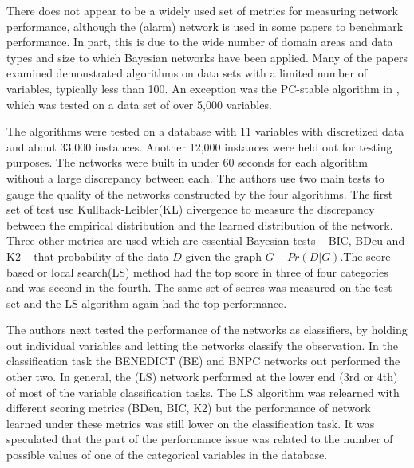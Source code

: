     
    There does not appear to be a widely used set of metrics for
    measuring network performance, although the (alarm) network
    is used in some papers to benchmark performance. 
    In part, this is due 
    to the wide number of domain areas and data types and size
    to which Bayesian networks have been applied. Many of the 
    papers examined demonstrated algorithms on data sets with
    a limited number of variables, typically less than 100. An 
    exception was the PC-stable algorithm in \cite{Colombo2014} , 
    which was tested on a data set of over 5,000 variables. 

    The algorithms were tested on a database with 11 variables 
    with discretized data and  
    about 33,000 instances. Another 12,000 instances were held out 
    for testing purposes. The networks were built in under 
    60 seconds for each algorithm without a large discrepancy 
    between each. The authors use two main tests to gauge the quality of the
    networks constructed by the four algorithms. The first set
    of test use Kullback-Leibler(KL) divergence to measure the
    discrepancy between the empirical distribution and the
    learned distribution of the network. Three other metrics
    are used which are essential Bayesian tests -- 
    BIC, BDeu and K2 -- that probability of the data $D$ 
    given the graph $G$ -- $Pr(D|G)$.The score-based or local search(LS) method had the top score
    in three of four categories and was second in the fourth. 
    The same set of scores was measured on the test set and
    the LS algorithm again had the top performance. 


    The authors next tested the performance of the networks as 
    classifiers, by holding out individual variables and
    letting the networks classify the observation. In
    the classification task the BENEDICT (BE) and 
    BNPC networks out performed the other two. In general, 
    the (LS) network performed at the lower end (3rd or 4th)
    of most of the variable classification tasks. The LS
    algorithm was relearned with different scoring
    metrics (BDeu, BIC, K2) but the performance of network
    learned under these metrics was still lower on 
    the classification task. It was speculated that the 
    part of the performance issue was related to the number
    of possible values of one of the categorical variables
    in the database.

